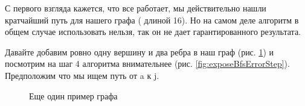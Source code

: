 \documentclass[../article.tex]{subfiles}
\begin{document}
С первого взгляда кажется, что все работает, мы действительно нашли кратчайший путь для нашего графа ({\firacodebold[a, f, g, h]} длиной 16). Но на самом деле алгоритм в общем случае использовать нельзя, так он не дает гарантированного результата.

Давайте добавим ровно одну вершину и два ребра в наш граф (рис. \ref{fig:exposeBfsError}) и посмотрим на шаг 4 алгоритма внимательнее (рис. \ref{fig:exposeBfsErrorStep}). Предположим что мы ищем путь от {\firacodebold a} к {\firacodebold j}.

\begin{figure}
    \caption{Еще один пример графа}
    \label{fig:exposeBfsError}
\end{figure}
\end{document}
